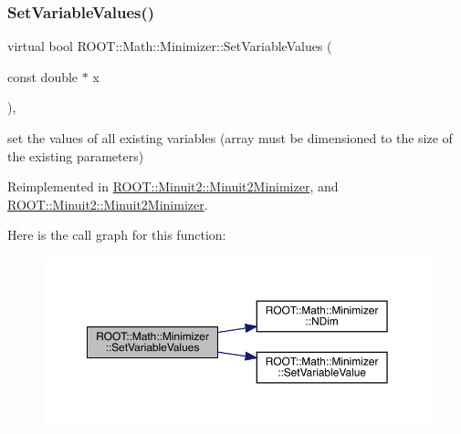 \subsubsection{\texorpdfstring{SetVariableValues()}{SetVariableValues()}\hspace{0.1cm}{\footnotesize\ttfamily [1/2]}}
{\footnotesize\ttfamily virtual bool R\+O\+O\+T\+::\+Math\+::\+Minimizer\+::\+Set\+Variable\+Values (\begin{DoxyParamCaption}\item[{const double $\ast$}]{x }\end{DoxyParamCaption})\hspace{0.3cm}{\ttfamily [inline]}, {\ttfamily [virtual]}}



set the values of all existing variables (array must be dimensioned to the size of the existing parameters) 



Reimplemented in \mbox{\hyperlink{classROOT_1_1Minuit2_1_1Minuit2Minimizer_a9511e9711f3d1505556af30046c87d03}{R\+O\+O\+T\+::\+Minuit2\+::\+Minuit2\+Minimizer}}, and \mbox{\hyperlink{classROOT_1_1Minuit2_1_1Minuit2Minimizer_a9511e9711f3d1505556af30046c87d03}{R\+O\+O\+T\+::\+Minuit2\+::\+Minuit2\+Minimizer}}.

Here is the call graph for this function\+:
\nopagebreak
\begin{figure}[H]
\begin{center}
\leavevmode
\includegraphics[width=350pt]{dc/dc4/classROOT_1_1Math_1_1Minimizer_ac8368efbd59da8e0b8bc0a0966309609_cgraph}
\end{center}
\end{figure}
\mbox{\label{classROOT_1_1Math_1_1Minimizer_ac8368efbd59da8e0b8bc0a0966309609}} 
